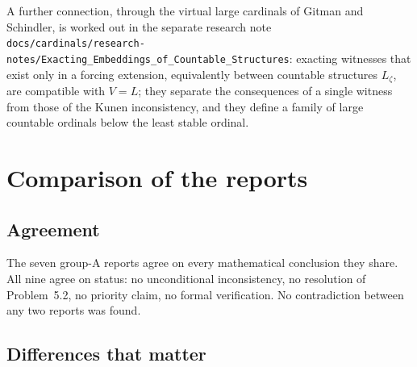 \documentclass[11pt,letterpaper]{article}
\theoremstyle{definition}
\numberwithin{equation}{section}
\begin{document}
A further connection, through the virtual large cardinals of Gitman and Schindler, is worked out in the separate research note \nolinkurl{docs/cardinals/research-notes/Exacting_Embeddings_of_Countable_Structures}: exacting witnesses that exist only in a forcing extension, equivalently between countable structures $L_\zeta$, are compatible with $V=L$; they separate the consequences of a single witness from those of the Kunen inconsistency, and they define a family of large countable ordinals below the least stable ordinal.

\section{Comparison of the reports}\label{sec:compare}

\subsection{Agreement}

The seven group-A reports agree on every mathematical conclusion they share. All nine agree on status: no unconditional inconsistency, no resolution of Problem~5.2, no priority claim, no formal verification. No contradiction between any two reports was found.

\subsection{Differences that matter}
\end{document}
